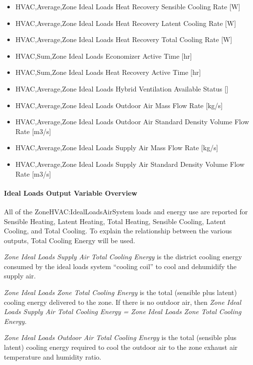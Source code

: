 \begin{itemize}
\item
  HVAC,Average,Zone Ideal Loads Heat Recovery Sensible Cooling Rate {[}W{]}
\item
  HVAC,Average,Zone Ideal Loads Heat Recovery Latent Cooling Rate {[}W{]}
\item
  HVAC,Average,Zone Ideal Loads Heat Recovery Total Cooling Rate {[}W{]}
\item
  HVAC,Sum,Zone Ideal Loads Economizer Active Time {[}hr{]}
\item
  HVAC,Sum,Zone Ideal Loads Heat Recovery Active Time {[}hr{]}
\item
  HVAC,Average,Zone Ideal Loads Hybrid Ventilation Available Status {[]}
\item
  HVAC,Average,Zone Ideal Loads Outdoor Air Mass Flow Rate {[}kg/s{]}
\item
  HVAC,Average,Zone Ideal Loads Outdoor Air Standard Density Volume Flow Rate {[}m3/s{]}
\item
  HVAC,Average,Zone Ideal Loads Supply Air Mass Flow Rate {[}kg/s{]}
\item
  HVAC,Average,Zone Ideal Loads Supply Air Standard Density Volume Flow Rate {[}m3/s{]}
\end{itemize}

\paragraph{Ideal Loads Output Variable Overview}\label{ideal-loads-output-variable-overview}

All of the ZoneHVAC:IdealLoadsAirSystem loads and energy use are reported for Sensible Heating, Latent Heating, Total Heating, Sensible Cooling, Latent Cooling, and Total Cooling. To explain the relationship between the various outputs, Total Cooling Energy will be used.

\emph{Zone Ideal Loads Supply Air Total Cooling Energy} is the district cooling energy consumed by the ideal loads system ``cooling coil'' to cool and dehumidify the supply air.

\emph{Zone Ideal Loads Zone Total Cooling Energy} is the total (sensible plus latent) cooling energy delivered to the zone. If there is no outdoor air, then \emph{Zone Ideal Loads Supply Air Total Cooling Energy = Zone Ideal Loads Zone Total Cooling Energy.}

\emph{Zone Ideal Loads Outdoor Air Total Cooling Energy} is the total (sensible plus latent) cooling energy required to cool the outdoor air to the zone exhaust air temperature and humidity ratio.

